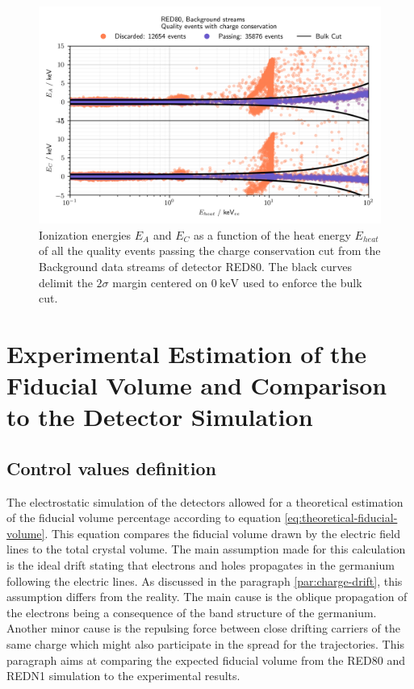 \begin{figure}
\centering
\includegraphics[scale=1]{Figures/ElectrodesExperimental/bulk_cut.png}
\caption{Ionization energies $E_A$ and $E_C$ as a function of the heat energy $E_{heat}$ of all the quality events passing the charge conservation cut from the Background data streams of detector RED80. The black curves delimit the $2\sigma$ margin centered on $\SI{0}{\kilo\eV}$ used to enforce the bulk cut.}
\label{fig:fiducial-cut}
\end{figure}


\section{Experimental Estimation of the Fiducial Volume and Comparison to the Detector Simulation}

\subsection{Control values definition}

The electrostatic simulation of the detectors allowed for a theoretical estimation of the fiducial volume percentage according to equation \ref{eq:theoretical-fiducial-volume}. This equation compares the fiducial volume drawn by the electric field lines to the total crystal volume. The main assumption made for this calculation is the ideal drift stating that electrons and holes propagates in the germanium following the electric lines. As discussed in the paragraph \ref{par:charge-drift}, this assumption differs from the reality. The main cause is the oblique propagation of the electrons being a consequence of the band structure of the germanium. Another minor cause is the repulsing force between close drifting carriers of the same charge which might also participate in the spread for the trajectories. This paragraph aims at comparing the expected fiducial volume from the RED80 and REDN1 simulation to the experimental results.

